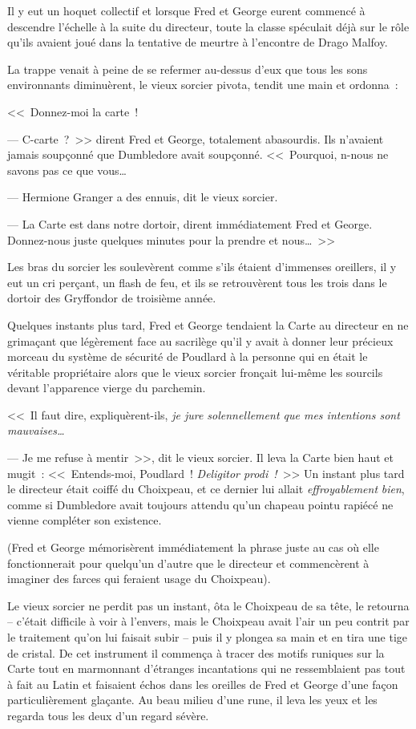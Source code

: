 Il y eut un hoquet collectif et lorsque Fred et George eurent commencé à descendre l'échelle à la suite du directeur, toute la classe spéculait déjà sur le rôle qu'ils avaient joué dans la tentative de meurtre à l'encontre de Drago Malfoy.

La trappe venait à peine de se refermer au-dessus d'eux que tous les sons environnants diminuèrent, le vieux sorcier pivota, tendit une main et ordonna~:

<<~Donnez-moi la carte~!

--- C-carte~?~>> dirent Fred et George, totalement abasourdis. Ils n'avaient jamais soupçonné que Dumbledore avait soupçonné. <<~Pourquoi, n-nous ne savons pas ce que vous…

--- Hermione Granger a des ennuis, dit le vieux sorcier.

--- La Carte est dans notre dortoir, dirent immédiatement Fred et George. Donnez-nous juste quelques minutes pour la prendre et nous…~>>

Les bras du sorcier les soulevèrent comme s'ils étaient d'immenses oreillers, il y eut un cri perçant, un flash de feu, et ils se retrouvèrent tous les trois dans le dortoir des Gryffondor de troisième année.

Quelques instants plus tard, Fred et George tendaient la Carte au directeur en ne grimaçant que légèrement face au sacrilège qu'il y avait à donner leur précieux morceau du système de sécurité de Poudlard à la personne qui en était le véritable propriétaire alors que le vieux sorcier fronçait lui-même les sourcils devant l'apparence vierge du parchemin.

<<~Il faut dire, expliquèrent-ils, \emph{je jure solennellement que mes intentions sont mauvaises…}

--- Je me refuse à mentir~>>, dit le vieux sorcier. Il leva la Carte bien haut et mugit~: <<~Entends-moi, Poudlard~! \emph{Deligitor prodi~!}~>> Un instant plus tard le directeur était coiffé du Choixpeau, et ce dernier lui allait \emph{effroyablement} \emph{bien}, comme si Dumbledore avait toujours attendu qu'un chapeau pointu rapiécé ne vienne compléter son existence.

(Fred et George mémorisèrent immédiatement la phrase juste au cas où elle fonctionnerait pour quelqu'un d'autre que le directeur et commencèrent à imaginer des farces qui feraient usage du Choixpeau).

Le vieux sorcier ne perdit pas un instant, ôta le Choixpeau de sa tête, le retourna -- c'était difficile à voir à l'envers, mais le Choixpeau avait l'air un peu contrit par le traitement qu'on lui faisait subir -- puis il y plongea sa main et en tira une tige de cristal. De cet instrument il commença à tracer des motifs runiques sur la Carte tout en marmonnant d'étranges incantations qui ne ressemblaient pas tout à fait au Latin et faisaient échos dans les oreilles de Fred et George d'une façon particulièrement glaçante. Au beau milieu d'une rune, il leva les yeux et les regarda tous les deux d'un regard sévère.

